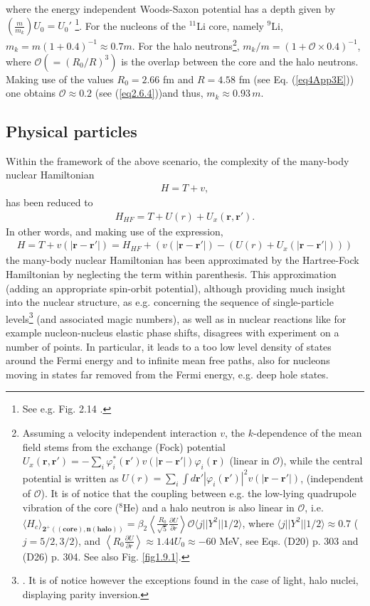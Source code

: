 where the energy independent Woods-Saxon potential has a depth given by\\\mbox{$\left(\frac{m}{m_k}\right)U_0=U_0'$} \footnote{See e.g. Fig. 2.14 \cite{Mahaux:85}.}. For the nucleons of the $^{11}$Li core, namely $^9$Li, $m_k=m(1+0.4)^{-1}\approx 0.7 m$. For the halo neutrons\footnote{\label{f117}Assuming a velocity independent interaction $v$, the $k$-dependence of the mean field stems from the exchange (Fock)  potential $U_x(\mathbf r, \mathbf r')=-\sum_i\varphi^*_i(\mathbf r')v(|\mathbf r-\mathbf r'|)\varphi_i(\mathbf r)$ (linear in $\mathcal O$), while the central potential is written as $U(r)=\sum_i\int d\mathbf r' |\varphi_i(\mathbf r')|^2v(|\mathbf r- \mathbf r'|)$, (independent of $\mathcal O$). It is of notice that the coupling between e.g. the low-lying  quadrupole vibration of the core ($^8$He) and a halo neutron is also linear in $\mathcal O$, i.e. $\langle H_c\rangle_{\pmb{2^+((\text{core}),n (\text{halo}))}}=\beta_2\left\langle\frac{R_0}{\sqrt{5}}\frac{\partial U}{\partial r}\right\rangle\mathcal O\langle j||Y^2||1/2\rangle$, where $\langle j||Y^2||1/2\rangle\approx0.7$ ($j=5/2,3/2$), and $\left\langle R_0\frac{\partial U}{\partial r}\right\rangle\approx1.44 U_0\approx -60$ MeV, see \cite{Brink:05} Eqs. (D20) p. 303 and (D26) p. 304. See also Fig. \ref{fig1.9.1}.}, $m_k/m=(1+\mathcal O\times0.4)^{-1}$, where $\mathcal O(=(R_0/R)^3)$ is the overlap between the core and the halo neutrons. Making use of the values $R_0=2.66$ fm and $R=4.58$ fm (see Eq. (\ref{eq4App3E}))  one obtains $\mathcal O\approx0.2$ (see (\ref{eq2.6.4}))and thus,  $m_k\approx 0.93 \,m$.
\subsection{Physical particles}\label{sect1.9.2}
Within the framework of the above scenario, the  complexity of the many-body nuclear Hamiltonian
\begin{align}
H=T+v,
\end{align}
has been reduced to
\begin{align}
H_{HF}=T+U(r)+U_x(\mathbf r,\mathbf r').
\end{align}
In other words, and making use of the expression,
\begin{align}\label{eq1.9.7}
H=T+v(|\mathbf r- \mathbf r'|)=H_{HF}+\left(v(|\mathbf r- \mathbf r'|)-(U(r)+U_x(|\mathbf r- \mathbf r'|))\right)
\end{align}
the  many-body nuclear Hamiltonian has been approximated by the Hartree-Fock Hamiltonian
by neglecting the term within parenthesis. This approximation (adding an appropriate spin-orbit potential), although providing much insight into the nuclear structure,  as e.g. concerning the sequence of single-particle levels\footnote{\cite{Mayer:55}. It is of notice however the exceptions found in the case of light, halo nuclei, displaying parity inversion.} (and associated magic numbers), as well as in nuclear reactions like for example  nucleon-nucleus elastic phase shifts, disagrees with experiment on a number of points. In particular, it leads to a too low level density of states around the Fermi energy and to  infinite mean free paths, also for nucleons moving in states far removed from the Fermi energy, e.g. deep hole states. 

